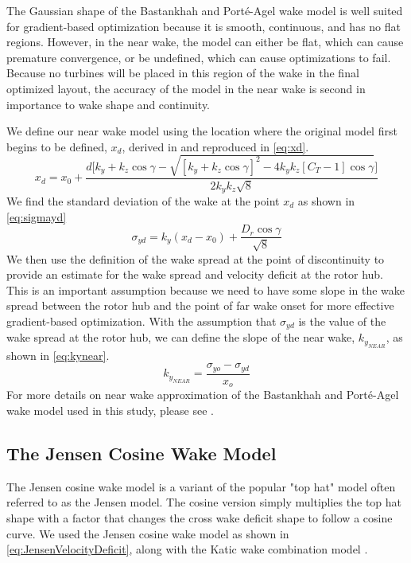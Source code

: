 \documentclass{jpconf}
\begin{document}
The Gaussian shape of the Bastankhah and Port\'e-Agel wake model is well suited for gradient-based optimization because it is smooth, continuous, and has no flat regions. However, in the near wake, the model can either be flat, which can cause premature convergence, or be undefined, which can cause optimizations to fail. Because no turbines will be placed in this region of the wake in the final optimized layout, the accuracy of the model in the near wake is second in importance to wake shape and continuity. 

We define our near wake model using the location where the original model first begins to be defined, $x_d$, derived in \cite{thomas2019-les-validation} and reproduced in \cref{eq:xd}.
%
\begin{equation}\label{eq:xd}
x_d = x_0 + \frac{d\Bigg[k_y+k_z\cos{\gamma} - \sqrt{[k_y+k_z\cos{\gamma}]^2-4k_y k_z[C_T-1]\cos{\gamma}}\Bigg]}{2k_y k_z\sqrt{8}}
\end{equation}
%
We find the standard deviation of the wake at the point $x_d$ as shown in \cref{eq:sigmayd}
%
\begin{equation}\label{eq:sigmayd}
\sigma_{yd} = k_y (x_d - x_0) + \frac{D_r \cos{\gamma}}{\sqrt{8}}
\end{equation}
%
We then use the definition of the wake spread at the point of discontinuity to provide an estimate for the wake spread and velocity deficit at the rotor hub. This is an important assumption because we need to have some slope in the wake spread between the rotor hub and the point of far wake onset for more effective gradient-based optimization. With the assumption that $\sigma_{yd}$ is the value of the wake spread at the rotor hub, we can define the slope of the near wake, $k_{y_{NEAR}}$, as shown in \cref{eq:kynear}.
%
\begin{equation}\label{eq:kynear}
k_{y_{NEAR}} = \frac{\sigma_{yo}-\sigma_{yd}}{x_o}
\end{equation}
For more details on near wake approximation of the Bastankhah and Port\'e-Agel wake model used in this study, please see \cite{thomas2019-les-validation}.

\subsection{The Jensen Cosine Wake Model}
The Jensen cosine wake model is a variant of the popular "top hat" model often referred to as the Jensen model. The cosine version simply multiplies the top hat shape with a factor that changes the cross wake deficit shape to follow a cosine curve. We used the Jensen cosine wake model as shown in \cref{eq:JensenVelocityDeficit}, along with the Katic wake combination model \cite{katic1986}.
\end{document}
